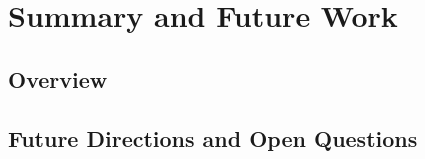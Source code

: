 \documentclass[main.tex]{subfiles}
\begin{document}
    \chapter[Summary and Future Work]{Summary and Future Work}

    {
        \minitoc
        \newpage
    }
    
    \section{Overview} \label{sec:ch5:overview}
    \section{Future Directions and Open Questions} \label{sec:ch5:future}
\end{document}
